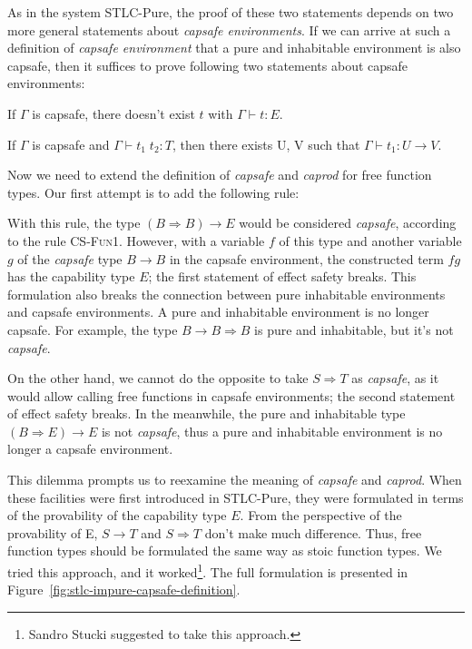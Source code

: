 As in the system STLC-Pure, the proof of these two statements depends
on two more general statements about \emph{capsafe environments}. If
we can arrive at such a definition of \emph{capsafe environment} that
a pure and inhabitable environment is also capsafe, then it suffices
to prove following two statements about capsafe environments:

\begin{definition}
  If $\Gamma$ is capsafe, there doesn't exist $t$ with
  $\Gamma \vdash t : E$.
\end{definition}

\begin{definition}
  If $\Gamma$ is capsafe and $\Gamma \vdash t_1 \; t_2 : T$, then
  there exists U, V such that $\Gamma \vdash t_1 : U \to V$.
\end{definition}

Now we need to extend the definition of \emph{capsafe} and
\emph{caprod} for free function types. Our first attempt is to add
the following rule:


With this rule, the type $(B \Rightarrow B) \to E$ would be considered
\emph{capsafe}, according to the rule \textsc{CS-Fun1}. However, with
a variable $f$ of this type and another variable $g$ of the
\emph{capsafe} type $B \to B$ in the capsafe environment, the
constructed term $f g$ has the capability type $E$; the first
statement of effect safety breaks. This formulation also breaks the
connection between pure inhabitable environments and capsafe
environments. A pure and inhabitable environment is no longer
capsafe. For example, the type $B \to B \Rightarrow B$ is pure and
inhabitable, but it's not \emph{capsafe}.

On the other hand, we cannot do the opposite to take $S \Rightarrow T$
as \emph{capsafe}, as it would allow calling free functions in capsafe
environments; the second statement of effect safety breaks. In the
meanwhile, the pure and inhabitable type $(B \Rightarrow E) \to E$ is
not \emph{capsafe}, thus a pure and inhabitable environment is no
longer a capsafe environment.

This dilemma prompts us to reexamine the meaning of \emph{capsafe} and
\emph{caprod}. When these facilities were first introduced in
STLC-Pure, they were formulated in terms of the provability of the
capability type $E$. From the perspective of the provability of E,
$S \to T$ and $S \Rightarrow T$ don't make much difference. Thus, free
function types should be formulated the same way as stoic function
types. We tried this approach, and it worked\footnote{Sandro Stucki
  suggested to take this approach.}. The full formulation is presented
in Figure~\ref{fig:stlc-impure-capsafe-definition}.

